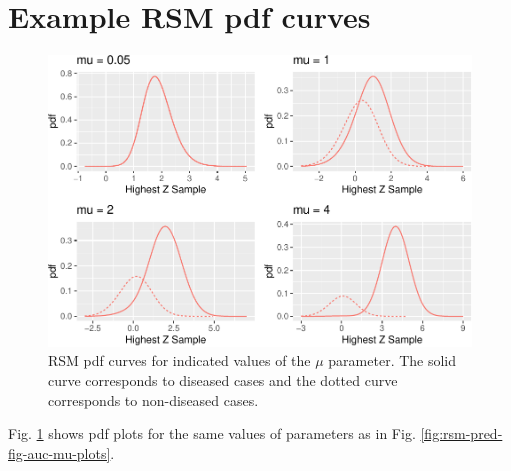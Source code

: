 \documentclass[
]{book}
\begin{document}
\hypertarget{rsm-pred-pdf-curves}{%
\section{Example RSM pdf curves}\label{rsm-pred-pdf-curves}}

\begin{figure}
\centering
\includegraphics{17a-rsm-predictions_files/figure-latex/rsm-pred-fig-pdf-mu-plots-1.pdf}
\caption{\label{fig:rsm-pred-fig-pdf-mu-plots}RSM pdf curves for indicated values of the \(\mu\) parameter. The solid curve corresponds to diseased cases and the dotted curve corresponds to non-diseased cases.}
\end{figure}

Fig. \ref{fig:rsm-pred-fig-pdf-mu-plots} shows pdf plots for the same values of parameters as in Fig. \ref{fig:rsm-pred-fig-auc-mu-plots}.
\end{document}
